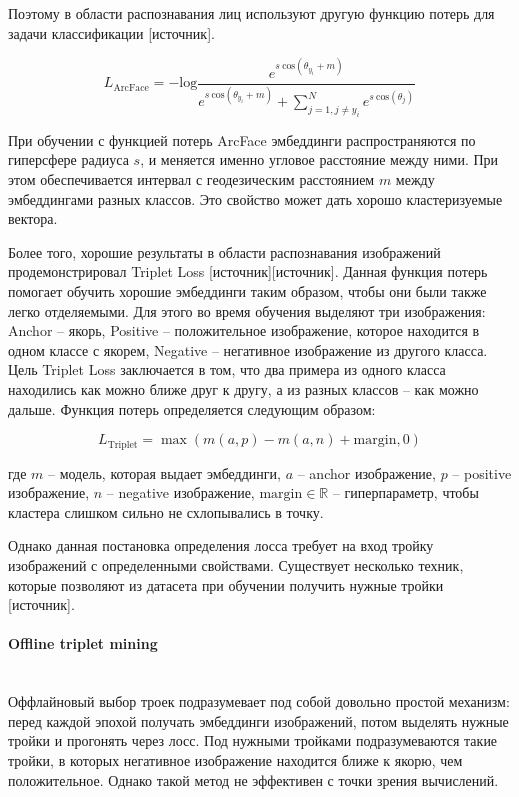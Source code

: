 Поэтому в области распознавания лиц используют другую функцию потерь для задачи классификации [источник]. 

$$
L_{\text{ArcFace}} = - \text{log} \frac{e^{s\:\text{cos}(\theta_{y_i} + m)}}
{e^{s\:\text{cos}(\theta_{y_i} + m)} + \sum^{N}_{j=1, j \neq y_i} e^{s\:\text{cos}(\theta_j)}}
$$
\smallskip

При обучении с функцией потерь ArcFace эмбеддинги распространяются по гиперсфере радиуса $s$, и меняется именно угловое расстояние между ними. При этом обеспечивается интервал с геодезическим расстоянием $m$ между эмбеддингами разных классов. Это свойство может дать хорошо кластеризуемые вектора.

Более того, хорошие результаты в области распознавания изображений продемонстрировал Triplet Loss [источник][источник]. Данная функция потерь помогает обучить хорошие эмбеддинги таким образом, чтобы они были также легко отделяемыми. Для этого во время обучения выделяют три изображения: Anchor -- якорь, Positive -- положительное изображение, которое находится в одном классе с якорем, Negative -- негативное изображение из другого класса. Цель Triplet Loss заключается в том, что два примера из одного класса находились как можно ближе друг к другу, а из разных классов -- как можно дальше. Функция потерь определяется следующим образом:

$$
L_{\text{Triplet}} = \max(m(a, p) - m(a, n) + \text{margin}, 0)
$$

\noindent
где $m$ -- модель, которая выдает эмбеддинги, $a$ -- anchor изображение, $p$ -- positive изображение, $n$ -- negative изображение, $\text{margin} \in \mathbb{R}$ -- гиперпараметр, чтобы кластера слишком сильно не схлопывались в точку.

Однако данная постановка определения лосса требует на вход тройку изображений с определенными свойствами. Существует несколько техник, которые позволяют из датасета при обучении получить нужные тройки [источник].

\paragraph{Offline triplet mining}\mbox{} \\

Оффлайновый выбор троек подразумевает под собой довольно простой механизм: перед каждой эпохой получать эмбеддинги изображений, потом выделять нужные тройки и прогонять через лосс. Под нужными тройками подразумеваются такие тройки, в которых негативное изображение находится ближе к якорю, чем положительное. Однако такой метод не эффективен с точки зрения вычислений.

